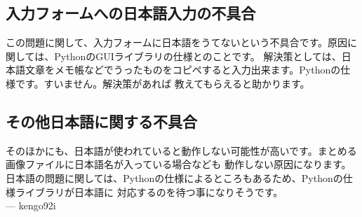 \documentclass[]{jsarticle}
\begin{document}
\subsection{入力フォームへの日本語入力の不具合}

この問題に関して、入力フォームに日本語をうてないという不具合です。原因に関しては、PythonのGUIライブラリの仕様とのことです。
解決策としては、日本語文章をメモ帳などでうったものをコピペすると入力出来ます。Pythonの仕様です。すいません。解決策があれば
教えてもらえると助かります。\\

\subsection{その他日本語に関する不具合}
そのほかにも、日本語が使われていると動作しない可能性が高いです。まとめる画像ファイルに日本語名が入っている場合なども
動作しない原因になります。日本語の問題に関しては、Pythonの仕様によるところもあるため、Pythonの仕様ライブラリが日本語に
対応するのを待つ事になりそうです。\\

--- kengo92i
\end{document}
